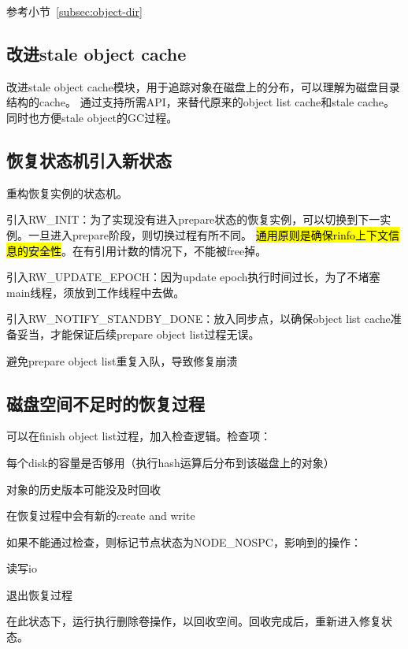 参考小节~\ref{subsec:object-dir}

\subsection{改进stale object cache}

改进stale object cache模块，用于追踪对象在磁盘上的分布，可以理解为磁盘目录结构的cache。
通过支持所需API，来替代原来的object list cache和stale cache。同时也方便stale object的GC过程。

\subsection{恢复状态机引入新状态}

重构恢复实例的状态机。

引入RW\_INIT：为了实现没有进入prepare状态的恢复实例，可以切换到下一实例。一旦进入prepare阶段，则切换过程有所不同。
\hl{通用原则是确保rinfo上下文信息的安全性}。在有引用计数的情况下，不能被free掉。

引入RW\_UPDATE\_EPOCH：因为update epoch执行时间过长，为了不堵塞main线程，须放到工作线程中去做。

引入RW\_NOTIFY\_STANDBY\_DONE：放入同步点，以确保object list cache准备妥当，才能保证后续prepare object list过程无误。

避免prepare object list重复入队，导致修复崩溃

\subsection{磁盘空间不足时的恢复过程}

可以在finish object list过程，加入检查逻辑。检查项：
\begin{enumbox}
\item 每个disk的容量是否够用（执行hash运算后分布到该磁盘上的对象）
\item 对象的历史版本可能没及时回收
\item 在恢复过程中会有新的create and write
\end{enumbox}

如果不能通过检查，则标记节点状态为NODE\_NOSPC，影响到的操作：
\begin{enumbox}
\item 读写io
\item 退出恢复过程
\end{enumbox}

在此状态下，运行执行删除卷操作，以回收空间。回收完成后，重新进入修复状态。

